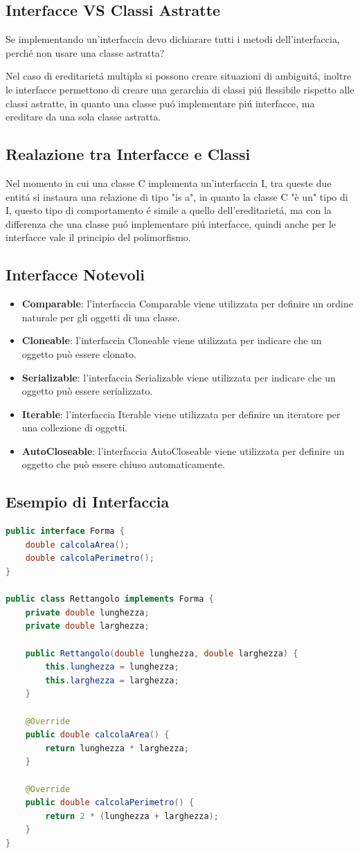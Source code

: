 \documentclass[11pt]{article}
\begin{document}
\subsection{Interfacce VS Classi Astratte}
Se implementando un'interfaccia devo dichiarare tutti i metodi dell'interfaccia, perché non usare una classe astratta?


Nel caso di ereditarietá multipla si possono creare situazioni di ambiguitá,
inoltre le interfacce permettono di creare una gerarchia di classi piú flessibile rispetto alle classi astratte,
in quanto una classe puó implementare piú interfacce, ma ereditare da una sola classe astratta.
\subsection{Realazione tra Interfacce e Classi}
Nel momento in cui una classe C implementa un'interfaccia I, tra queste due entitá si instaura una relazione di tipo "is a", in quanto la classe C "è un" tipo di I,
questo tipo di comportamento é simile a quello dell'ereditarietá, ma con la differenza che una classe puó implementare piú interfacce, quindi anche per le interfacce vale il principio del polimorfismo.
\subsection{Interfacce Notevoli}
\begin{itemize}
    \item \textbf{Comparable}: l'interfaccia Comparable viene utilizzata per definire un ordine naturale per gli oggetti di una classe.
    \item \textbf{Cloneable}: l'interfaccia Cloneable viene utilizzata per indicare che un oggetto può essere clonato.
    \item \textbf{Serializable}: l'interfaccia Serializable viene utilizzata per indicare che un oggetto può essere serializzato.
    \item \textbf{Iterable}: l'interfaccia Iterable viene utilizzata per definire un iteratore per una collezione di oggetti.
    \item \textbf{AutoCloseable}: l'interfaccia AutoCloseable viene utilizzata per definire un oggetto che può essere chiuso automaticamente.
\end{itemize}
\subsection{Esempio di Interfaccia}
\begin{lstlisting}[language=Java]
public interface Forma {
    double calcolaArea();
    double calcolaPerimetro();
}

public class Rettangolo implements Forma {
    private double lunghezza;
    private double larghezza;

    public Rettangolo(double lunghezza, double larghezza) {
        this.lunghezza = lunghezza;
        this.larghezza = larghezza;
    }

    @Override
    public double calcolaArea() {
        return lunghezza * larghezza;
    }

    @Override
    public double calcolaPerimetro() {
        return 2 * (lunghezza + larghezza);
    }
}
\end{lstlisting}
\end{document}
